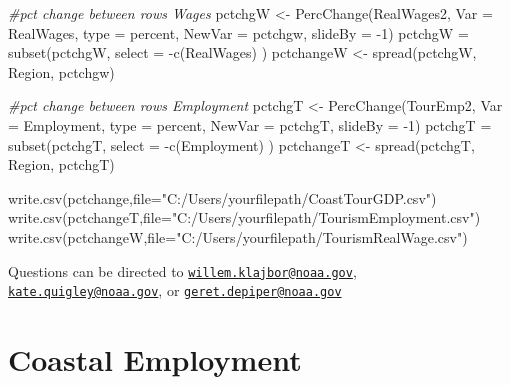 \documentclass[
]{book}
\newenvironment{Shaded}{\begin{snugshade}}{\end{snugshade}}
\newcommand{\AttributeTok}[1]{\textcolor[rgb]{0.77,0.63,0.00}{#1}}
\newcommand{\CommentTok}[1]{\textcolor[rgb]{0.56,0.35,0.01}{\textit{#1}}}
\newcommand{\DecValTok}[1]{\textcolor[rgb]{0.00,0.00,0.81}{#1}}
\newcommand{\FunctionTok}[1]{\textcolor[rgb]{0.00,0.00,0.00}{#1}}
\newcommand{\NormalTok}[1]{#1}
\newcommand{\OtherTok}[1]{\textcolor[rgb]{0.56,0.35,0.01}{#1}}
\newcommand{\SpecialCharTok}[1]{\textcolor[rgb]{0.00,0.00,0.00}{#1}}
\newcommand{\StringTok}[1]{\textcolor[rgb]{0.31,0.60,0.02}{#1}}
\begin{document}
\begin{Shaded}
\begin{Highlighting}[]
\CommentTok{\#pct change between rows Wages}
\NormalTok{pctchgW }\OtherTok{\textless{}{-}} \FunctionTok{PercChange}\NormalTok{(RealWages2, }\AttributeTok{Var =} \StringTok{\textquotesingle{}RealWages\textquotesingle{}}\NormalTok{,}
                     \AttributeTok{type =} \StringTok{\textquotesingle{}percent\textquotesingle{}}\NormalTok{,}
                     \AttributeTok{NewVar =} \StringTok{\textquotesingle{}pctchgw\textquotesingle{}}\NormalTok{,}
                     \AttributeTok{slideBy =} \SpecialCharTok{{-}}\DecValTok{1}\NormalTok{)}
\NormalTok{pctchgW }\OtherTok{=} \FunctionTok{subset}\NormalTok{(pctchgW, }\AttributeTok{select =} \SpecialCharTok{{-}}\FunctionTok{c}\NormalTok{(RealWages) )}
\NormalTok{pctchangeW }\OtherTok{\textless{}{-}} \FunctionTok{spread}\NormalTok{(pctchgW, Region, pctchgw)}

\CommentTok{\#pct change between rows Employment}
\NormalTok{pctchgT }\OtherTok{\textless{}{-}} \FunctionTok{PercChange}\NormalTok{(TourEmp2, }\AttributeTok{Var =} \StringTok{\textquotesingle{}Employment\textquotesingle{}}\NormalTok{,}
                      \AttributeTok{type =} \StringTok{\textquotesingle{}percent\textquotesingle{}}\NormalTok{,}
                      \AttributeTok{NewVar =} \StringTok{\textquotesingle{}pctchgT\textquotesingle{}}\NormalTok{,}
                      \AttributeTok{slideBy =} \SpecialCharTok{{-}}\DecValTok{1}\NormalTok{)}
\NormalTok{pctchgT }\OtherTok{=} \FunctionTok{subset}\NormalTok{(pctchgT, }\AttributeTok{select =} \SpecialCharTok{{-}}\FunctionTok{c}\NormalTok{(Employment) )}
\NormalTok{pctchangeT }\OtherTok{\textless{}{-}} \FunctionTok{spread}\NormalTok{(pctchgT, Region, pctchgT)}

\FunctionTok{write.csv}\NormalTok{(pctchange,}\AttributeTok{file=}\StringTok{"C:/Users/yourfilepath/CoastTourGDP.csv"}\NormalTok{)}
\FunctionTok{write.csv}\NormalTok{(pctchangeT,}\AttributeTok{file=}\StringTok{"C:/Users/yourfilepath/TourismEmployment.csv"}\NormalTok{)}
\FunctionTok{write.csv}\NormalTok{(pctchangeW,}\AttributeTok{file=}\StringTok{"C:/Users/yourfilepath/TourismRealWage.csv"}\NormalTok{)}
\end{Highlighting}
\end{Shaded}

Questions can be directed to \href{mailto:willem.klajbor@noaa.gov}{\nolinkurl{willem.klajbor@noaa.gov}}, \href{mailto:kate.quigley@noaa.gov}{\nolinkurl{kate.quigley@noaa.gov}}, or \href{mailto:geret.depiper@noaa.gov}{\nolinkurl{geret.depiper@noaa.gov}}

\hypertarget{coastal-employment}{%
\chapter{Coastal Employment}\label{coastal-employment}}
\end{document}
